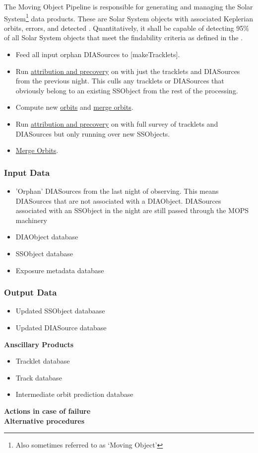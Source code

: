 The Moving Object Pipeline is responsible for generating and managing the Solar System\footnote{Also sometimes referred to as `Moving Object'} data products. These are Solar System objects with associated Keplerian orbits, errors, and detected \DIASources. Quantitatively, it shall be capable of detecting 95\% of all Solar System objects that meet the findability criteria as defined in the \OSS\@. 

\begin{itemize}
\item Feed all input orphan DIASources to \hyperref[sec:acMakeTracklets][makeTracklets]. 
\item Run \hyperref[sec:acAttributionAndPrecovery]{attribution and precovery} on with just the tracklets and DIASources from the previous night.  This culls any tracklets or DIASources that obviously belong to an existing SSObject from the rest of the processing. 
\item Compute new \hyperref[sec:acOrbitFitting]{orbits} and \hyperref[sec:acOrbitMerging]{merge orbits}. 
\item Run \hyperref[sec:acAttributionAndPrecovery]{attribution and precovery} on with full survey of tracklets and DIASources but only running over new SSObjects. 
\item \hyperref[sec:acOrbitMerging]{Merge Orbits}. 
\end{itemize}

\subsubsection{Input Data}

\begin{itemize}
\item 'Orphan' DIASources from the last night of observing.  This means DIASources that are not associated with a DIAObject.  DIASources associated with an SSObject in the night are still passed through the MOPS machinery
\item DIAObject database
\item SSObject database
\item Exposure metadata database
\end{itemize}

\subsubsection{Output Data}
\begin{itemize}
\item Updated SSObject databaase
\item Updated DIASource database
\end{itemize}
{\bf Anscillary Products}\\
\begin{itemize}
\item Tracklet database
\item Track database
\item Intermediate orbit prediction database
\end{itemize}
{\bf Actions in case of failure}\\
{\bf Alternative procedures}\\


